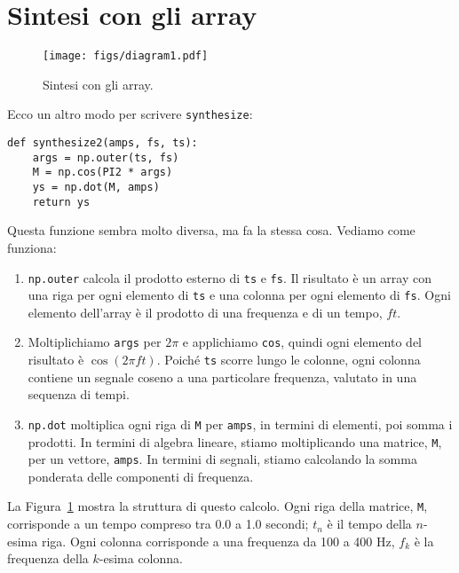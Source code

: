 \documentclass[12pt]{book} \usepackage[width=5.5in,height=8.5in, hmarginratio=3:2,vmarginratio=1:1]{geometry}
\begin{document}
\section{Sintesi con gli array} \label{synthesis} 

\begin{figure} \centerline{\texttt{[image: figs/diagram1.pdf]}} \caption{Sintesi con gli array.} \label{fig.synthesis} \end{figure} 

Ecco un altro modo per scrivere {\tt synthesize}:

\begin{verbatim} 
def synthesize2(amps, fs, ts):
    args = np.outer(ts, fs)
    M = np.cos(PI2 * args)
    ys = np.dot(M, amps)
    return ys
 \end{verbatim} 

Questa funzione sembra molto diversa, ma fa la stessa cosa. Vediamo come funziona:

\begin{enumerate} 

\item {\tt np.outer} calcola il prodotto esterno di {\tt ts} e {\tt fs}. Il risultato è un array con una riga per ogni elemento di {\tt ts} e una colonna per ogni elemento di {\tt fs}. Ogni elemento dell'array è il prodotto di una frequenza e di un tempo, $f t$.

\item Moltiplichiamo {\tt args} per $2 \pi$ e applichiamo {\tt cos}, quindi ogni elemento del risultato è $\cos (2 \pi f t)$. Poiché {\tt ts} scorre lungo le colonne, ogni colonna contiene un segnale coseno a una particolare frequenza, valutato in una sequenza di tempi.

\item {\tt np.dot} moltiplica ogni riga di {\tt M} per {\tt amps}, in termini di elementi, poi somma i prodotti. In termini di algebra lineare, stiamo moltiplicando una matrice, {\tt M}, per un vettore, {\tt amps}. In termini di segnali, stiamo calcolando la somma ponderata delle componenti di frequenza.

\end{enumerate} 

La Figura~\ref{fig.synthesis} mostra la struttura di questo calcolo. Ogni riga della matrice, {\tt M}, corrisponde a un tempo compreso tra 0.0 a 1.0 secondi; $t_n$ è il tempo della $n$-esima riga. Ogni colonna corrisponde a una frequenza da 100 a 400 Hz, $f_k$ è la frequenza della $k$-esima colonna.
\end{document}
